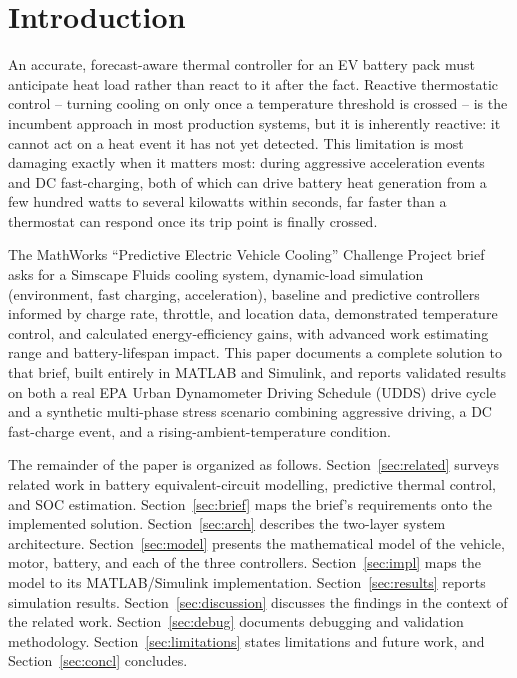 \documentclass[10pt,conference]{IEEEtran}
\begin{document}
\section{Introduction}
\label{sec:intro}

An accurate, forecast-aware thermal controller for an EV battery pack must anticipate heat load rather than react to it after the fact. Reactive thermostatic control -- turning cooling on only once a temperature threshold is crossed -- is the incumbent approach in most production systems, but it is inherently reactive: it cannot act on a heat event it has not yet detected. This limitation is most damaging exactly when it matters most: during aggressive acceleration events and DC fast-charging, both of which can drive battery heat generation from a few hundred watts to several kilowatts within seconds, far faster than a thermostat can respond once its trip point is finally crossed.

The MathWorks ``Predictive Electric Vehicle Cooling'' Challenge Project brief~\cite{mathworks_hub} asks for a Simscape Fluids cooling system, dynamic-load simulation (environment, fast charging, acceleration), baseline and predictive controllers informed by charge rate, throttle, and location data, demonstrated temperature control, and calculated energy-efficiency gains, with advanced work estimating range and battery-lifespan impact. This paper documents a complete solution to that brief, built entirely in MATLAB and Simulink, and reports validated results on both a real EPA Urban Dynamometer Driving Schedule (UDDS) drive cycle and a synthetic multi-phase stress scenario combining aggressive driving, a DC fast-charge event, and a rising-ambient-temperature condition.

The remainder of the paper is organized as follows. Section~\ref{sec:related} surveys related work in battery equivalent-circuit modelling, predictive thermal control, and SOC estimation. Section~\ref{sec:brief} maps the brief's requirements onto the implemented solution. Section~\ref{sec:arch} describes the two-layer system architecture. Section~\ref{sec:model} presents the mathematical model of the vehicle, motor, battery, and each of the three controllers. Section~\ref{sec:impl} maps the model to its MATLAB/Simulink implementation. Section~\ref{sec:results} reports simulation results. Section~\ref{sec:discussion} discusses the findings in the context of the related work. Section~\ref{sec:debug} documents debugging and validation methodology. Section~\ref{sec:limitations} states limitations and future work, and Section~\ref{sec:concl} concludes.
\end{document}
